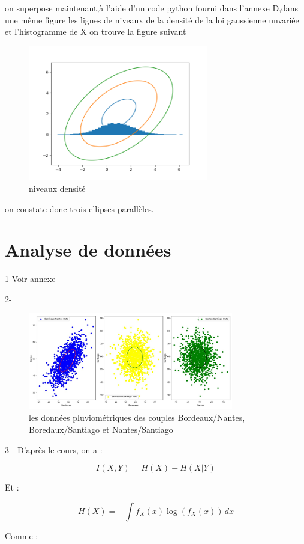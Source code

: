 \documentclass[a4paper]{article}
\begin{document}
on superpose maintenant,à l'aide d'un code python fourni dans l'annexe D,dans une même figure les lignes de niveaux de la densité de la loi gaussienne unvariée et l'histogramme de X on trouve la figure suivant
\begin{figure}[h]
  \centering
  \includegraphics[width=0.7\textwidth]{7.png}
  \caption{niveaux densité}
\end{figure}
on constate donc trois ellipses parallèles.
\section{Analyse de données}


   1-Voir annexe 


   2-
   \begin{figure}[h]
     \centering
     \includegraphics[width=0.8\textwidth]{exo4_qst_2.png}
     \caption{les données pluviométriques des couples Bordeaux/Nantes, Boredaux/Santiago et Nantes/Santiago}
   \end{figure}


   3 - D'après le cours, on a :

\[ I(X, Y) = H(X) - H(X | Y) \]

Et :

\[ H(X) = -\int f_X(x) \log(f_X(x)) \,dx \]

Comme :
\end{document}
